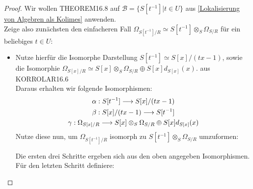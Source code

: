 \documentclass[10pt,a4paper]{report}
\newcommand{\comment}[1]{}
\newcommand{\functionfront}[3]{\nolinebreak{#1:#2 \longrightarrow #3}}
\newcommand{\divR}[2]{\Omega_{#1/#2}}
\newcommand{\divf}[1]{d_{#1}}
\newcommand{\Tensor}[3]{#1 \otimes_{#2} #3}
\newcommand{\tensor}[3]{#1 \otimes #3}
\newcommand{\lok}[2]{#1 [#2^{-1}]}
\newcommand{\loke}[3]{(\frac{#1}{#2})_{_{#3}}}
\newcommand*{\defeqr}{= \mathrel{\vcenter{\baselineskip0.5ex \lineskiplimit0pt
                     \hbox{\scriptsize.}\hbox{\scriptsize.}}}}
\begin{document}
\begin{proof}
Wir wollen THEOREM16.8 \comment{\label{THEOREM16.8}} auf $\mathcal{B} = \lbrace \lok{S}{t} \vert t \in U \rbrace$ aus \cref{Lokalisierung von Algebren als Kolimes} anwenden.\\
Zeige also zunächsten den einfacheren Fall $\divR{\lok{S}{t}}{R} \simeq \Tensor{\lok{S}{t}}{S}{\divR{S}{R}}$ für ein beliebiges $t \in U$:
\begin{itemize}
\item[]
Nutze hierfür die Isomorphe Darstellung $\lok{S}{t} \simeq S[x]/(tx -1)$, sowie die Isomorphie $\divR{S[x]}{R} \simeq \Tensor{S[x]}{S}{\divR{S}{R}} \oplus S[x]\divf{S[x]}(x)$. aus KORROLAR16.6 \comment{\label{Korrolar16.6}}\\
Daraus erhalten wir folgende Isomorphismen:
\begin{gather*}
\functionfront{\alpha}{\lok{S}{t}}{S[x]/(tx -1)} \\
\functionfront{\beta}{S[x]/(tx -1)}{\lok{S}{t}} \\
\functionfront{\gamma}{\divR{S[x]}{R}}{ \Tensor{S[x]}{S}{\divR{S}{R}} \oplus S[x]\divf{S[x]}(x) }
\end{gather*}
Nutze diese nun, um $\divR{\lok{S}{t}}{R}$ isomorph zu $\Tensor{\lok{S}{t}}{S}{\divR{S}{R}}$ umzuformen:
\begin{center}
\end{center}
Die ersten drei Schritte ergeben sich aus den oben angegeben Isomorphismen. Für den letzten Schritt definiere:

\end{itemize}
\end{proof}
\end{document}
